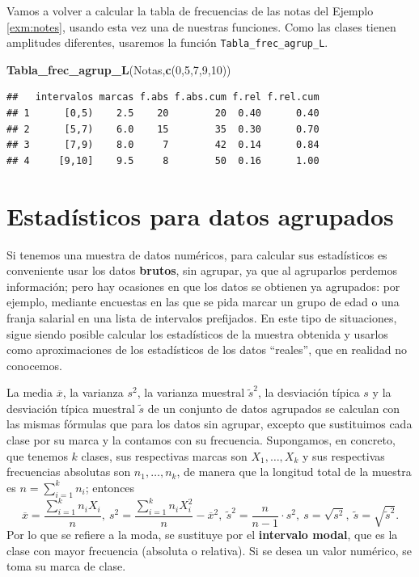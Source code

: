 \documentclass[]{book}
\newenvironment{Shaded}{\begin{snugshade}}{\end{snugshade}}
\newcommand{\DecValTok}[1]{\textcolor[rgb]{0.00,0.00,0.81}{#1}}
\newcommand{\KeywordTok}[1]{\textcolor[rgb]{0.13,0.29,0.53}{\textbf{#1}}}
\newcommand{\NormalTok}[1]{#1}
\theoremstyle{definition}
\theoremstyle{definition}
\theoremstyle{definition}
\theoremstyle{remark}
\let\BeginKnitrBlock\begin \let\EndKnitrBlock\end
\begin{document}
\BeginKnitrBlock{example}
\protect\hypertarget{exm:unnamed-chunk-665}{}{\label{exm:unnamed-chunk-665} }Vamos a volver a calcular la tabla de frecuencias de las notas del Ejemplo \ref{exm:notes}, usando esta vez una de nuestras funciones. Como las clases tienen amplitudes diferentes, usaremos la función \texttt{Tabla\_frec\_agrup\_L}.
\EndKnitrBlock{example}

\begin{Shaded}
\begin{Highlighting}[]
\KeywordTok{Tabla_frec_agrup_L}\NormalTok{(Notas,}\KeywordTok{c}\NormalTok{(}\DecValTok{0}\NormalTok{,}\DecValTok{5}\NormalTok{,}\DecValTok{7}\NormalTok{,}\DecValTok{9}\NormalTok{,}\DecValTok{10}\NormalTok{))}
\end{Highlighting}
\end{Shaded}

\begin{verbatim}
##   intervalos marcas f.abs f.abs.cum f.rel f.rel.cum
## 1      [0,5)    2.5    20        20  0.40      0.40
## 2      [5,7)    6.0    15        35  0.30      0.70
## 3      [7,9)    8.0     7        42  0.14      0.84
## 4     [9,10]    9.5     8        50  0.16      1.00
\end{verbatim}

\hypertarget{estadisticos-para-datos-agrupados}{%
\section{Estadísticos para datos agrupados}\label{estadisticos-para-datos-agrupados}}

Si tenemos una muestra de datos numéricos, para calcular sus estadísticos es conveniente usar los datos \textbf{brutos}, sin agrupar, ya que al agruparlos perdemos información; pero hay ocasiones en que los datos se obtienen ya agrupados: por ejemplo, mediante encuestas en las que se pida marcar un grupo de edad o una franja salarial en una lista de intervalos prefijados. En este tipo de situaciones, sigue siendo posible calcular los estadísticos de la muestra obtenida y usarlos como aproximaciones de los estadísticos de los datos ``reales'', que en realidad no conocemos.

La media \(\overline{x}\), la varianza \(s^2\), la varianza muestral \(\tilde{s}^2\), la desviación típica \(s\) y la desviación típica muestral \(\tilde{s}\) de un conjunto de datos agrupados se calculan con las mismas fórmulas que para los datos sin agrupar, excepto que sustituimos cada clase por su marca y la contamos con su frecuencia. Supongamos, en concreto, que tenemos \(k\) clases, sus respectivas marcas son \(X_1,\ldots,X_k\) y sus respectivas frecuencias absolutas son \(n_1,\ldots,n_k\), de manera que la longitud total de la muestra es
\(n=\sum_{i=1}^k n_i\); entonces
\[
\overline{x}=\frac{\sum_{i=1}^k n_iX_i}{n},\
s^2=\frac{\sum_{i=1}^k n_iX^2_i}{n}-\overline{x}^2,\
\tilde{s}^2=\frac{n}{n-1}\cdot s^2,\
s=\sqrt{s^2},\
\tilde{s}=\sqrt{\widetilde{s}^2}.
\]
Por lo que se refiere a la moda, se sustituye por el \textbf{intervalo modal}, que es la clase con mayor frecuencia (absoluta o relativa). Si se desea un valor numérico, se toma su marca de clase.
\end{document}
